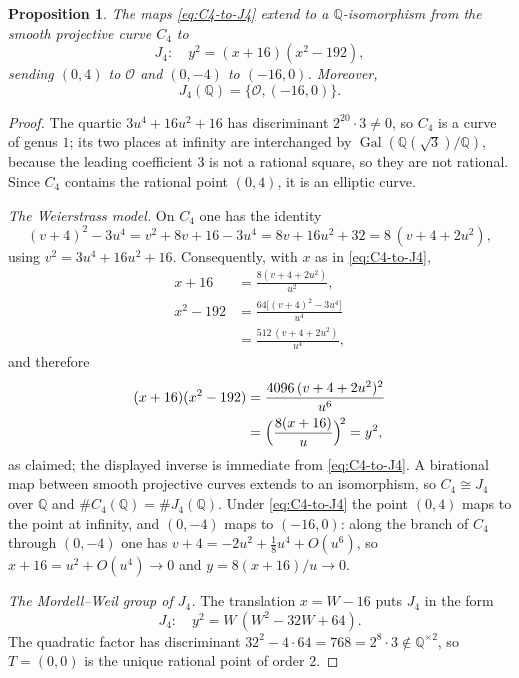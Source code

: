 \documentclass[11pt,a4paper]{amsart}
\newtheorem{proposition}[theorem]{Proposition}
\theoremstyle{definition}
\theoremstyle{remark}
\numberwithin{equation}{section}
\newcommand{\Q}{\mathbb{Q}}
\begin{document}
\begin{proposition}\label{prop:J4-arithmetic}
The maps \eqref{eq:C4-to-J4} extend to a $\Q$-isomorphism from the smooth
projective curve $C_4$ to
\[
J_4:\quad y^2=(x+16)(x^2-192),
\]
sending $(0,4)$ to $\mathcal O$ and $(0,-4)$ to $(-16,0)$. Moreover,
\[
J_4(\Q)=\{\mathcal O,(-16,0)\}.
\]
\end{proposition}

\begin{proof}
The quartic $3u^4+16u^2+16$ has discriminant $2^{20}\cdot3\neq0$, so $C_4$ is a curve of genus $1$; its two places at infinity are interchanged by $\operatorname{Gal}(\Q(\sqrt3)/\Q)$, because the leading coefficient $3$ is not a rational square, so they are not rational. Since $C_4$ contains the rational point $(0,4)$, it is an elliptic curve.

\emph{The Weierstrass model.} On $C_4$ one has the identity
\[
(v+4)^2-3u^4=v^2+8v+16-3u^4=8v+16u^2+32=8\,(v+4+2u^2),
\]
using $v^2=3u^4+16u^2+16$. Consequently, with $x$ as in \eqref{eq:C4-to-J4},
\begin{align*}
x+16&=\frac{8(v+4+2u^2)}{u^2},\\
x^2-192&=\frac{64\bigl[(v+4)^2-3u^4\bigr]}{u^4}\\
&=\frac{512\,(v+4+2u^2)}{u^4},
\end{align*}
and therefore
\begin{align*}
(x+16)(x^2-192)
&=\frac{4096\,(v+4+2u^2)^2}{u^6}\\
&=\Bigl(\frac{8(x+16)}{u}\Bigr)^{\!2}=y^2,
\end{align*}
as claimed; the displayed inverse is immediate from \eqref{eq:C4-to-J4}. A birational map between smooth projective curves extends to an isomorphism, so $C_4\cong J_4$ over $\Q$ and $\#C_4(\Q)=\#J_4(\Q)$. Under \eqref{eq:C4-to-J4} the point $(0,4)$ maps to the point at infinity, and $(0,-4)$ maps to $(-16,0)$: along the branch of $C_4$ through $(0,-4)$ one has $v+4=-2u^2+\tfrac18u^4+O(u^6)$, so $x+16=u^2+O(u^4)\to0$ and $y=8(x+16)/u\to0$.

\emph{The Mordell--Weil group of $J_4$.} The translation $x=W-16$ puts $J_4$ in the form
\[
J_4:\quad y^2=W\,(W^2-32W+64).
\]
The quadratic factor has discriminant $32^2-4\cdot64=768=2^8\cdot3\notin\Q^{\times2}$, so $T=(0,0)$ is the unique rational point of order $2$.


\end{proof}
\end{document}
